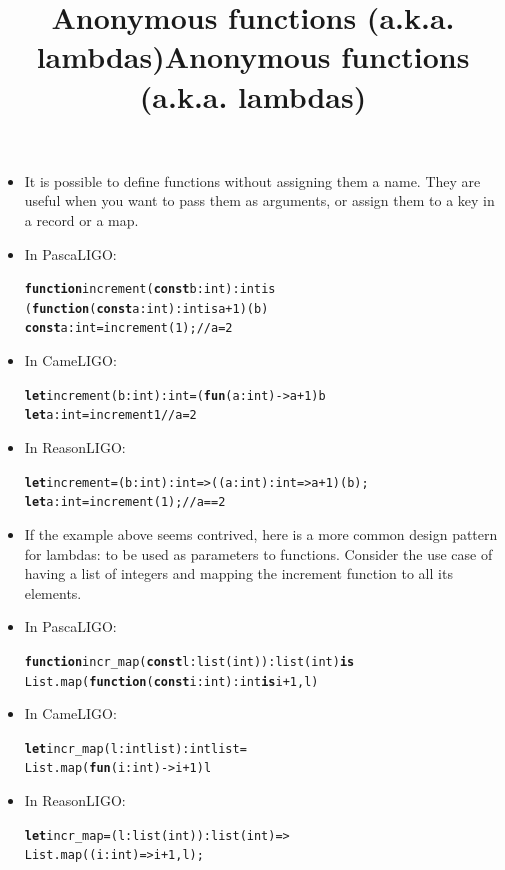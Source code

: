 \documentclass[wide]{slides}
\newcommand{\Kconst}[0]{\textbf{const}\xspace}
\newcommand{\Kfunction}[0]{\textbf{function}\xspace}
\newcommand{\Kis}[0]{\textbf{is}\xspace}
\newcommand{\Kfun}[0]{\textbf{fun}\xspace}
\newcommand{\Klet}[0]{\textbf{let}\xspace}
\begin{document}
\begin{slide}
  \title{Anonymous functions (a.k.a. lambdas)}

  \begin{itemize}

    \item It is possible to define functions without assigning them a
      name. They are useful when you want to pass them as arguments,
      or assign them to a key in a record or a map.

    \item In PascaLIGO:
      \begin{alltt}
\Kfunction increment (\Kconst b : int) : int is
   (\Kfunction (\Kconst a : int) : int is a + 1) (b)
\Kconst a : int = increment (1); // a = 2
      \end{alltt}

    \item In CameLIGO:
      \begin{alltt}
\Klet increment (b : int) : int = (\Kfun (a : int) -> a + 1) b
\Klet a : int = increment 1 // a = 2
      \end{alltt}

    \item In ReasonLIGO:
      \begin{alltt}
\Klet increment = (b : int) : int => ((a : int) : int => a + 1) (b);
\Klet a : int = increment (1); // a == 2
      \end{alltt}
  \end{itemize}

\end{slide}


\begin{slide}
  \title{Anonymous functions (a.k.a. lambdas)}

  \begin{itemize}

    \item If the example above seems contrived, here is a more common
      design pattern for lambdas: to be used as parameters to
      functions. Consider the use case of having a list of integers
      and mapping the increment function to all its elements.

    \item In PascaLIGO:
      \begin{alltt}
\Kfunction incr_map (\Kconst l : list (int)) : list (int) \Kis
  List.map (\Kfunction (\Kconst i : int) : int \Kis i + 1, l)
      \end{alltt}

    \item In CameLIGO:
      \begin{alltt}
\Klet incr_map (l : int list) : int list =
  List.map (\Kfun (i : int) -> i + 1) l
      \end{alltt}

    \item In ReasonLIGO:
      \begin{alltt}
\Klet incr_map = (l : list (int)) : list (int) =>
  List.map ((i : int) => i + 1, l);
      \end{alltt}
  \end{itemize}

\end{slide}
\end{document}
